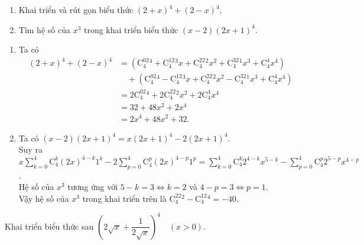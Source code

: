 \begin{bt}%
\begin{enumerate}
\item Khai triển và rút gọn biểu thức $(2+x)^4+(2-x)^4$.
\item Tìm hệ số của $x^3$ trong khai triển biểu thức $(x-2)(2x+1)^4$.
\end{enumerate}
\loigiai
{
\begin{enumerate}
\item Ta có
\begin{align*}
(2+x)^4+(2-x)^4
&=\left(\mathrm{C}_4^02^4+\mathrm{C}_4^12^3x+\mathrm{C}_4^22^2x^2+\mathrm{C}_4^32^1x^3+\mathrm{C}_4^4x^4\right) \\
&\quad+\left(\mathrm{C}_4^02^4-\mathrm{C}_4^12^3x+\mathrm{C}_4^22^2x^2-\mathrm{C}_4^32^1x^3+\mathrm{C}_4^4x^4\right) \\
&=2\mathrm{C}_4^02^4+2\mathrm{C}_4^22^2x^2+2\mathrm{C}_4^4x^4 \\
&=32+48x^2+2x^4 \\
&=2x^4+48x^2+32.
\end{align*}
\item Ta có $(x-2)(2x+1)^4=x(2x+1)^4-2(2x+1)^4$.\\
Suy ra $x \displaystyle\sum\limits_{k=0}^{4}\mathrm{C}_4^k(2x)^{4-k}1^k-2\displaystyle\sum\limits_{p=0}^{4}\mathrm{C}_4^p(2x)^{4-p}1^p= \displaystyle\sum\limits_{k=0}^{4}\mathrm{C}_4^k2^{4-k}x^{5-k}-\displaystyle\sum\limits_{p=0}^{4}\mathrm{C}_4^p2^{5-p}x^{4-p}$.\\ Hệ số của $x^3$ tương ứng với $5-k=3\Leftrightarrow k =2$ và $4-p=3 \Leftrightarrow p=1$.\\
Vậy hệ số của $x^3$ trong khai triển trên là $\mathrm{C}_4^22^2-\mathrm{C}_4^12^4=-40.$
\end{enumerate}
}
\end{bt}

\begin{bt}%
Khai triển biểu thức sau $\left(2 \sqrt{x}+\dfrac{1}{2 \sqrt{x}}\right)^4\quad(x>0)$.
\end{bt}

